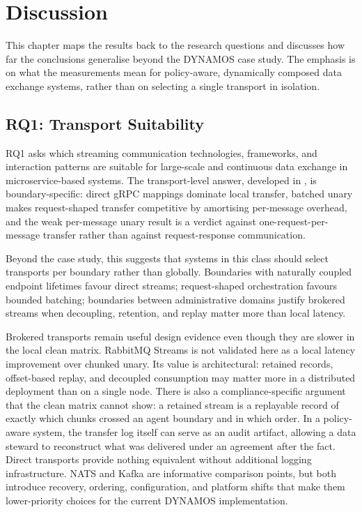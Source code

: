 \chapter{Discussion}\label{ch:discussion}

This chapter maps the results back to the research questions and discusses how far the conclusions generalise beyond the DYNAMOS case study. The emphasis is on what the measurements mean for policy-aware, dynamically composed data exchange systems, rather than on selecting a single transport in isolation.

\section{RQ1: Transport Suitability}\label{sec:discussion-rq1}

RQ1 asks which streaming communication technologies, frameworks, and interaction patterns are suitable for large-scale and continuous data exchange in microservice-based systems. The transport-level answer, developed in , is boundary-specific: direct gRPC mappings dominate local transfer, batched unary makes request-shaped transfer competitive by amortising per-message overhead, and the weak per-message unary result is a verdict against one-request-per-message transfer rather than against request-response communication.

Beyond the case study, this suggests that systems in this class should select transports per boundary rather than globally. Boundaries with naturally coupled endpoint lifetimes favour direct streams; request-shaped orchestration favours bounded batching; boundaries between administrative domains justify brokered streams when decoupling, retention, and replay matter more than local latency.

Brokered transports remain useful design evidence even though they are slower in the local clean matrix. RabbitMQ Streams is not validated here as a local latency improvement over chunked unary. Its value is architectural: retained records, offset-based replay, and decoupled consumption may matter more in a distributed deployment than on a single node. There is also a compliance-specific argument that the clean matrix cannot show: a retained stream is a replayable record of exactly which chunks crossed an agent boundary and in which order. In a policy-aware system, the transfer log itself can serve as an audit artifact, allowing a data steward to reconstruct what was delivered under an agreement after the fact. Direct transports provide nothing equivalent without additional logging infrastructure. NATS and Kafka are informative comparison points, but both introduce recovery, ordering, configuration, and platform shifts that make them lower-priority choices for the current DYNAMOS implementation.



